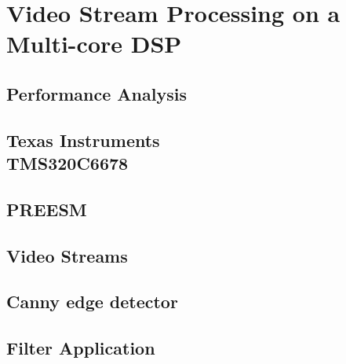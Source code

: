 \chapter{Video Stream Processing on a Multi-core DSP}
\label{chapter:experiments}


\section{Performance Analysis}
\label{sec:performance-analysis}


\section[Texas Instruments TMS320C6678]{Texas Instruments\\TMS320C6678}
\label{sec:c6678}


\section{PREESM}
\label{sec:preesm}


\section{Video Streams}
\label{sec:video-streams}

\section{Canny edge detector}
\label{sec:canny}


\section{Filter Application}
\label{sec:filterapp}


